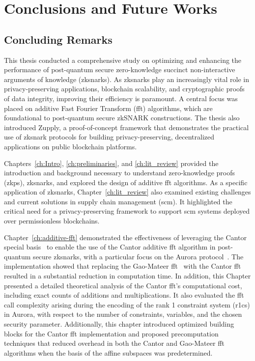 \chapter{Conclusions and Future Works} \label{ch:conclusion}


\section{Concluding Remarks}
This thesis conducted a comprehensive study on optimizing and enhancing the performance of post-quantum secure zero-knowledge succinct non-interactive arguments of knowledge (\glspl{zksnark}). As \glspl{zksnark} play an increasingly vital role in privacy-preserving applications, blockchain scalability, and cryptographic proofs of data integrity, improving their efficiency is paramount. A central focus was placed on additive Fast Fourier Transform (\gls{fft}) algorithms, which are foundational to post-quantum secure zkSNARK constructions. The thesis also introduced Zupply, a proof-of-concept framework that demonstrates the practical use of \gls{zksnark} protocols for building privacy-preserving, decentralized applications on public blockchain platforms.


Chapters~\ref{ch:Intro}, \ref{ch:preliminaries}, and \ref{ch:lit_review} provided the introduction and background necessary to understand zero-knowledge proofs (\glspl{zkp}), \glspl{zksnark}, and explored the design of additive \gls{fft} algorithms. As a specific application of \glspl{zksnark}, Chapter~\ref{ch:lit_review} also examined existing challenges and current solutions in supply chain management (\gls{scm}). It highlighted the critical need for a privacy-preserving framework to support \gls{scm} systems deployed over permissionless blockchains.

Chapter~\ref{ch:additive-fft} demonstrated the effectiveness of leveraging the Cantor special basis~\cite{Cantor1989FFT} to enable the use of the Cantor additive \gls{fft} algorithm in post-quantum secure \glspl{zksnark}, with a particular focus on the Aurora protocol~\cite{Aurora2019}. The implementation showed that replacing the Gao-Mateer \gls{fft}~\cite{Gao2010FFT} with the Cantor \gls{fft} resulted in a substantial reduction in computation time. In addition, this Chapter presented a detailed theoretical analysis of the Cantor \gls{fft}'s computational cost, including exact counts of additions and multiplications. It also evaluated the \gls{fft} call complexity arising during the encoding of the  rank 1 constraint system (\gls{r1cs}) in Aurora, with respect to the number of constraints, variables, and the chosen security parameter. Additionally, this chapter introduced optimized building blocks for the Cantor \gls{fft} implementation and proposed precomputation techniques that reduced overhead in both the Cantor and Gao-Mateer \gls{fft} algorithms when the basis of the affine subspaces was predetermined.

